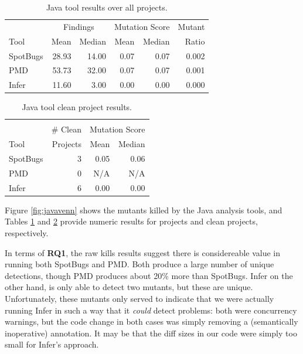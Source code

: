 \begin{table}
  \begin{tabular}{l|r|r|r|r|r}
    & \multicolumn{2}{|c|}{Findings} & \multicolumn{2}{|c|}{Mutation Score}  & Mutant \\
    Tool & Mean & Median & Mean & Median & Ratio\\
    \hline
    \hline
    SpotBugs & 28.93 & 14.00 & 0.07 & 0.07 & 0.002 \\
    \hline
    PMD & 53.73 & 32.00 & 0.07 & 0.07 & 0.001 \\
    \hline
    Infer & 11.60 & 3.00 & 0.00 & 0.00 &  0.000 \\
    \hline
  \end{tabular}
  \caption{Java tool results over all projects.}
  \label{tab:scorejava}
\end{table}

\begin{table}
  \begin{tabular}{l|r|r|r}
    & & \multicolumn{2}{|c|}{} \\
    & \# Clean & \multicolumn{2}{|c|}{Mutation Score} \\
    Tool & Projects & Mean & Median \\
    \hline
    \hline
    SpotBugs & 3 & 0.05 & 0.06 \\
    \hline
    PMD & 0 & N/A & N/A \\
    \hline
    Infer & 6 & 0.00 & 0.00 \\
    \hline
  \end{tabular}
  \caption{Java tool clean project results.}
  \label{tab:cleanjava}
\end{table}

Figure \ref{fig:javavenn} shows the mutants killed by the Java analysis tools, and Tables \ref{tab:scorejava} and \ref{tab:cleanjava} provide numeric results for projects and clean projects, respectively.

In terms of {\bf RQ1}, the raw kills results suggest there is considereable value in running both SpotBugs and PMD.  Both produce a large number of unique detections, though PMD produces about 20\% more than SpotBugs.
Infer on the other hand, is only able to detect two mutants, but these are unique.  Unfortunately, these mutants only served to indicate that we were actually running Infer in such a way that it \emph{could} detect problems:  both were concurrency warnings, but the code change in both cases was simply removing a (semantically inoperative) {\tt \@Override} annotation.  It may be that the diff sizes in our code were simply too small for Infer's approach.

